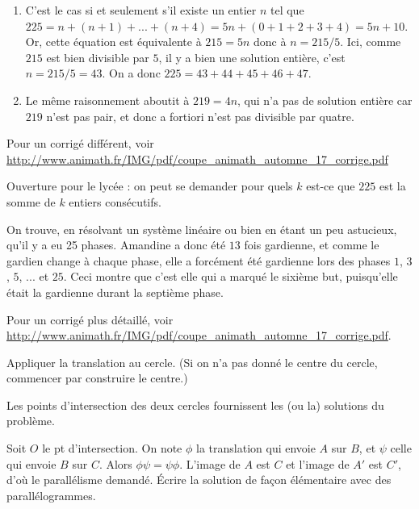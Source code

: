 \begin{Soln}{52}
\begin{enumerate}
\item C'est le cas si et seulement s'il existe un entier $n$ tel que $225 = n+(n+1)+...+(n+4) = 5n + (0+1+2+3+4) = 5n+10$. Or, cette équation est équivalente à $215=5n$ donc à $n = 215/5$. Ici, comme $215$ est bien divisible par $5$, il y a bien une solution entière, c'est $n=215/5=43$. On a donc $225=43+44+45+46+47$.
\item Le même raisonnement aboutit à $219=4n$, qui n'a pas de solution entière car $219$ n'est pas pair, et donc a fortiori n'est pas divisible par quatre.
\end{enumerate}
Pour un corrigé différent, voir \url{http://www.animath.fr/IMG/pdf/coupe_animath_automne_17_corrige.pdf}

Ouverture pour le lycée : on peut se demander pour quels $k$ est-ce que $225$ est la somme de $k$ entiers consécutifs.
\end{Soln}
\begin{Soln}{53}
On trouve, en résolvant un système linéaire ou bien en étant un peu astucieux, qu'il y a eu 25 phases. Amandine a donc été $13$ fois gardienne, et comme le gardien change à chaque phase, elle a forcément été gardienne lors des phases $1$, $3$, $5$, ... et $25$. Ceci montre que c'est elle qui a marqué le sixième but, puisqu'elle était la gardienne durant la septième phase.

Pour un corrigé plus détaillé, voir \url{http://www.animath.fr/IMG/pdf/coupe_animath_automne_17_corrige.pdf}.
\end{Soln}
\begin{Soln}{54}
Appliquer la translation au cercle. (Si on n'a pas donné le centre du cercle, commencer par construire le centre.)

Les points d'intersection des deux cercles fournissent les (ou la) solutions du problème.
\end{Soln}
\begin{Soln}{56}
Soit $O$ le pt d'intersection. On note $\phi$ la translation qui envoie $A$ sur $B$, et $\psi$ celle qui envoie $B$ sur $C$. Alors $\phi\psi = \psi\phi$. L'image de $A$ est $C$ et l'image de $A'$ est $C'$, d'où le  parallélisme demandé.
\'Ecrire la solution de façon élémentaire avec des parallélogrammes.
\end{Soln}
